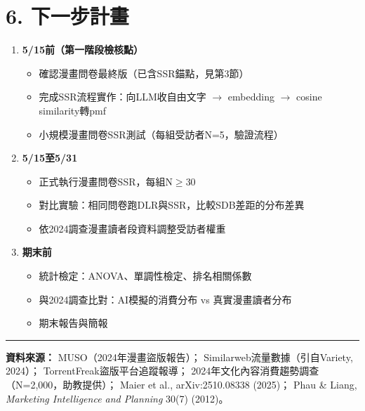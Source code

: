 \documentclass[12pt, a4paper]{article}
\begin{document}
\section{6. 下一步計畫}

\begin{enumerate}
  \item \textbf{5/15前（第一階段檢核點）}
    \begin{itemize}
      \item 確認漫畫問卷最終版（已含SSR錨點，見第3節）
      \item 完成SSR流程實作：向LLM收自由文字 $\rightarrow$ embedding $\rightarrow$ cosine similarity轉pmf
      \item 小規模漫畫問卷SSR測試（每組受訪者N=5，驗證流程）
    \end{itemize}
  \item \textbf{5/15至5/31}
    \begin{itemize}
      \item 正式執行漫畫問卷SSR，每組N$\geq$30
      \item 對比實驗：相同問卷跑DLR與SSR，比較SDB差距的分布差異
      \item 依2024調查漫畫讀者段資料調整受訪者權重
    \end{itemize}
  \item \textbf{期末前}
    \begin{itemize}
      \item 統計檢定：ANOVA、單調性檢定、排名相關係數
      \item 與2024調查比對：AI模擬的消費分布 vs 真實漫畫讀者分布
      \item 期末報告與簡報
    \end{itemize}
\end{enumerate}

\vspace{1em}
\noindent\rule{\linewidth}{0.5pt}
{\small
\textbf{資料來源：}
MUSO（2024年漫畫盜版報告）；
Similarweb流量數據（引自Variety, 2024）；
TorrentFreak盜版平台追蹤報導；
2024年文化內容消費趨勢調查（N=2,000，助教提供）；
Maier et al., arXiv:2510.08338 (2025)；
Phau \& Liang, \textit{Marketing Intelligence and Planning} 30(7) (2012)。
}
\end{document}
